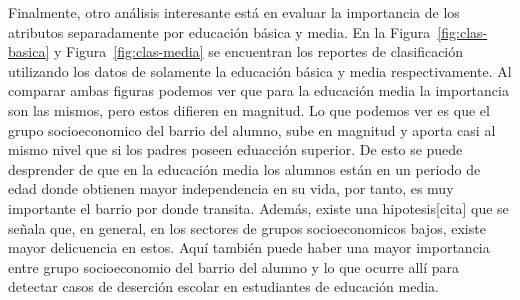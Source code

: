 Finalmente, otro análisis interesante está en evaluar la importancia de los atributos separadamente por educación básica y media. En la Figura~\ref{fig:clas-basica} y Figura~\ref{fig:clas-media} se encuentran los reportes de clasificación utilizando los datos de solamente la educación básica y media respectivamente. Al comparar ambas figuras podemos ver que para la educación media la importancia son las mismos, pero estos difieren en magnitud. Lo que podemos ver es que el grupo socioeconomico del barrio del alumno, sube en magnitud y aporta casi al mismo nivel que si los padres poseen eduacción superior. De esto se puede desprender de que en la educación media los alumnos están en un periodo de edad donde obtienen mayor independencia en su vida, por tanto, es muy importante el barrio por donde transita. Además, existe una hipotesis[cita] que se señala que, en general, en los sectores de grupos socioeconomicos bajos, existe mayor delicuencia en estos. Aquí también puede haber una mayor importancia entre grupo socioeconomio del barrio del alumno y lo que ocurre allí para detectar casos de deserción escolar en estudiantes de educación media.


